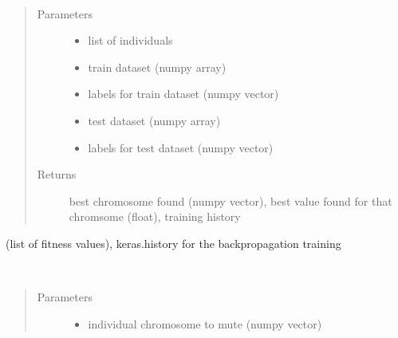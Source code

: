 \documentclass[letterpaper,10pt,english]{sphinxmanual}
\begin{document}
\begin{fulllineitems}

\begin{fulllineitems}
\label{\detokenize{index:genetic_optimizer.GeneticNeuralWeightOptimizer.fit}}~\begin{quote}\begin{description}
\item[{Parameters}] \leavevmode\begin{itemize}
\item {} 
 \textendash{} list of individuals

\item {} 
 \textendash{} train dataset (numpy array)

\item {} 
 \textendash{} labels for train dataset (numpy vector)

\item {} 
 \textendash{} test dataset (numpy array)

\item {} 
 \textendash{} labels for test dataset (numpy vector)

\end{itemize}

\item[{Returns}] \leavevmode
best chromosome found (numpy vector), best value found for that chromsome (float), training history

\end{description}\end{quote}

(list of fitness values), keras.history for the backpropagation training

\end{fulllineitems}


\begin{fulllineitems}
\label{\detokenize{index:genetic_optimizer.GeneticNeuralWeightOptimizer.fitness}}~\begin{quote}\begin{description}
\item[{Parameters}] \leavevmode\begin{itemize}
\item {} 
 \textendash{} individual chromosome to mute (numpy vector)


\end{itemize}
\end{description}
\end{quote}
\end{fulllineitems}
\end{fulllineitems}
\end{document}
